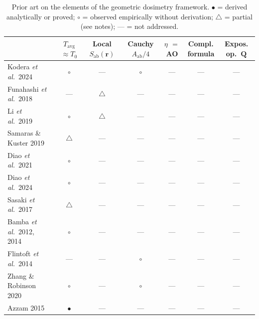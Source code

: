 \documentclass[11pt,a4paper]{article}
\theoremstyle{definition}      %
\newcommand{\rr}{\mathbf{r}}
\newcommand{\Sab}{S_{\mathrm{ab}}}
\newcommand{\Tavg}{T_{\mathrm{avg}}}
\newcommand{\Aab}{A_{\mathrm{ab}}}
\begin{document}
\begin{table}[!htbp]
\centering
\begin{threeparttable}
\caption{Prior art on the elements of the geometric dosimetry
  framework.
  $\bullet$ = derived analytically or proved;
  $\circ$ = observed empirically without derivation;
  $\triangle$ = partial (see notes);
  --- = not addressed.}\label{tab:lit:comparison}
\small
\begin{tabularx}{\textwidth}{X
  c@{\hskip 4pt}c@{\hskip 4pt}c@{\hskip 4pt}c@{\hskip 4pt}c@{\hskip 4pt}c}
\toprule
& \makecell{$\Tavg$\\$\approx T_0$}
& \makecell{Local\\$\Sab(\rr)$}
& \makecell{Cauchy\\$\Aab/4$}
& \makecell{$\eta$\\$=$ AO}
& \makecell{Compl.\\formula}
& \makecell{Expos.\\op.\ $\mathbf{Q}$} \\
\midrule
Kodera \textit{et al.}\ 2024~\cite{Kodera2024}
  & $\circ$ & ---   & $\circ$ & ---   & ---   & --- \\
Funahashi \textit{et al.}\ 2018~\cite{Funahashi2018}
  & ---     & $\triangle$\tnote{1} & ---   & ---   & ---   & --- \\
Li \textit{et al.}\ 2019~\cite{Li2019}
  & $\circ$ & $\triangle$\tnote{2} & ---   & ---   & ---   & --- \\
Samaras \& Kuster 2019~\cite{Samaras2019}
  & $\triangle$\tnote{3} & ---   & ---   & ---   & ---   & --- \\
Diao \textit{et al.}\ 2021~\cite{Diao2021}
  & $\circ$ & ---   & ---   & ---   & ---   & --- \\
Diao \textit{et al.}\ 2024~\cite{Diao2024}
  & $\circ$ & ---   & ---   & ---   & ---   & --- \\
Sasaki \textit{et al.}\ 2017~\cite{Sasaki2017}
  & $\triangle$\tnote{4} & ---   & ---   & ---   & ---   & --- \\
Bamba \textit{et al.}\ 2012, 2014~\cite{Bamba2012,Bamba2014}
  & $\circ$ & ---   & ---   & ---   & ---   & --- \\
Flintoft \textit{et al.}\ 2014~\cite{Flintoft2014}
  & ---     & ---   & $\circ$ & ---   & ---   & --- \\
Zhang \& Robinson 2020~\cite{ZhangRobinson2020}
  & $\circ$ & ---   & $\circ$ & ---   & ---   & --- \\
Azzam 2015~\cite{Azzam2015}
  & $\bullet$\tnote{5} & ---   & ---   & ---   & ---   & --- \\

\end{tabularx}
\end{threeparttable}
\end{table}
\end{document}
